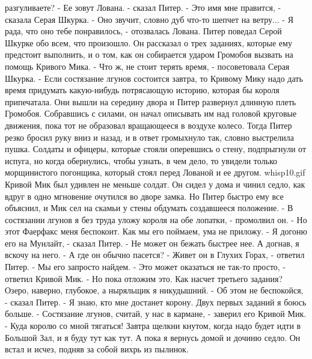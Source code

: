 разгуливаете?
    - Ее зовут Лована. - сказал Питер.
    - Это имя мне правится, - сказала Серая Шкурка. - Оно звучит, 
словно дуб что-то шепчет на ветру...
    - Я рада, что оно тебе понравилось, - отозвалась Лована.
    Питер поведал Серой Шкурке обо всем, что произошло. Он рассказал о 
трех заданиях, которые ему предстоит выполнить, и о том, как он 
собирается ударом Громобоя вызвать на помощь Кривого Мика.
    - Что ж, не стоит терять время, - посоветовала Серая Шкурка. - 
Если состязание лгунов состоится завтра, то Кривому Мику надо дать 
время придумать какую-нибудь потрясающую историю, которая бы короля 
припечатала.
    Они вышли на середину двора и Питер развернул длинную плеть 
Громобоя. Собравшись с силами, он начал описывать им над головой 
круговые движения, пока тот не образовал вращающееся в воздухе колесо. 
Тогда Питер резко бросил руку вниз и назад, и в ответ громыхнуло так, 
словно выстрелила пушка. Солдаты и офицеры, которые стояли оперевшись 
о стену, подпрыгнули от испуга, но когда обернулись, чтобы узнать, в 
чем дело, то увидели только морщинистого погонщика, который стоял 
перед Лованой и ее другом.
    {whisp10.gif}
    Кривой Мик был удивлен не меньше солдат. Он сидел у дома и чинил 
седло, как вдруг в одно мгновение очутился во дворе замка. Но Питер 
быстро ему все объяснил, и Мик сел на скамьи у стены обдумать 
создавшееся положение.
    - В состязании лгунов я без труда уложу короля на обе лопатки, - 
промолвил он. - Но этот Фаерфакс меня беспокоит. Как мы его поймаем, 
ума не приложу.
    - Я догоню его на Мунлайт, - сказал Питер. - Не может он бежать 
быстрее нее. А догнав, я вскочу на него.
    - А где он обычно пасется?
    - Живет он в Глухих Горах, - ответил Питер. - Мы его запросто 
найдем.
    - Это может оказаться не так-то просто, - ответил Кривой Мик. - Но 
пока отложим это. Как насчет третьего задания? Озеро, наверно, 
глубокое, а ныряльщик я никудышний.
    - Об этом не беспокойся, - сказал Питер. - Я знаю, кто мне 
достанет корону. Двух первых заданий я боюсь больше.
    - Состязание лгунов, считай, у нас в кармане, - заверил его Кривой 
Мик. - Куда королю со мной тягаться! Завтра щелкни кнутом, когда надо 
будет идти в Большой Зал, и я буду тут как тут. А пока я вернусь домой 
и дочиню седло.
    Он встал и исчез, подняв за собой вихрь из пылинок.
